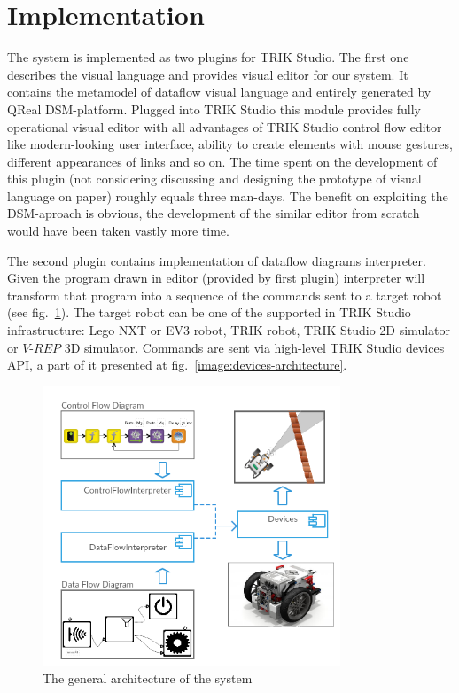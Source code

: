 \documentclass[conference,compsoc]{IEEEtran}
\begin{document}
\section{Implementation}
\label{sec:Implementation}
The system is implemented as two plugins for TRIK Studio. The first one describes the visual language and provides visual editor for our system. It contains the metamodel of dataflow visual language and entirely generated by QReal DSM-platform. Plugged into TRIK Studio this module provides fully operational visual editor with all advantages of TRIK Studio control flow editor like modern-looking user interface, ability to create elements with mouse gestures, different appearances of links and so on. The time spent on the development of this plugin (not considering discussing and designing the prototype of visual language on paper) roughly equals three man-days. The benefit on exploiting the DSM-aproach is obvious, the development of the similar editor from scratch would have been taken vastly more time.

The second plugin contains implementation of dataflow diagrams interpreter. Given the program drawn in editor (provided by first plugin) interpreter will transform that program into a sequence of the commands sent to a target robot (see fig.~\ref{image:common-architecture}). The target robot can be one of the supported in TRIK Studio infrastructure: Lego NXT or EV3 robot, TRIK robot, TRIK Studio 2D simulator or $V\mbox{-}REP$ 3D simulator\cite{rohmer2013v}. Commands are sent via high-level TRIK Studio devices API, a part of it presented at fig.~\ref{image:devices-architecture}.

\begin{figure}[ht]
	\centering
	\includegraphics[width=3.5in]{Common.png}
	\caption{The general architecture of the system}
	\label{image:common-architecture}
\end{figure}
\end{document}
